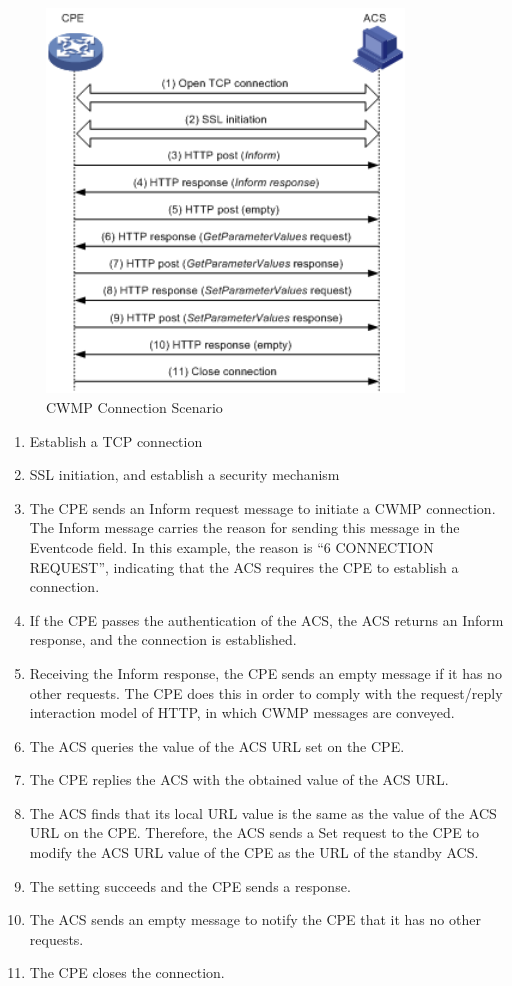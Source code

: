 \begin{figure}[htbp]
	\centering
		\includegraphics[width=9.5cm]{Figures/connection_request.png}
	\caption[CWMP Connection Scenario]{CWMP Connection Scenario}
	\label{fig:connectionrequest}
\end{figure}

\begin{enumerate}
  \item Establish a TCP connection
  \item SSL initiation, and establish a security mechanism
  \item The CPE sends an Inform request message to initiate a CWMP connection. The Inform message carries the reason for sending this message in the Eventcode field. In this example, the reason is “6 CONNECTION REQUEST”, indicating that the ACS requires the CPE to establish a connection.
  \item If the CPE passes the authentication of the ACS, the ACS returns an Inform response, and the connection is established.
  \item Receiving the Inform response, the CPE sends an empty message if it has no other requests. The CPE does this in order to comply with the request/reply interaction model of HTTP, in which CWMP messages are conveyed.
  \item The ACS queries the value of the ACS URL set on the CPE.
  \item The CPE replies the ACS with the obtained value of the ACS URL.
  \item The ACS finds that its local URL value is the same as the value of the ACS URL on the CPE. Therefore, the ACS sends a Set request to the CPE to modify the ACS URL value of the CPE as the URL of the standby ACS.
  \item The setting succeeds and the CPE sends a response.
  \item The ACS sends an empty message to notify the CPE that it has no other requests.
  \item The CPE closes the connection.
\end{enumerate}

